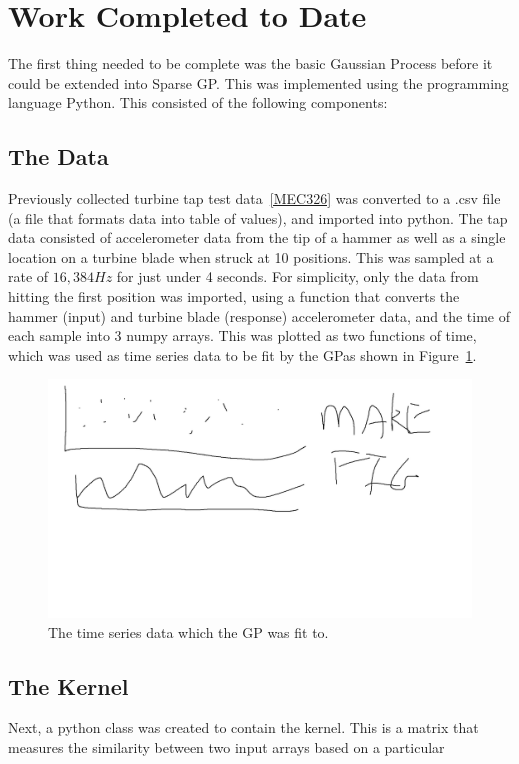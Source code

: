 \documentclass[12pt]{article}
\begin{document}
    \section{Work Completed to Date}
    The first thing needed to be complete was the basic Gaussian Process before it could be extended into Sparse GP\@.
    This was implemented using the programming language Python.
    This consisted of the following components:
    \subsection{The Data}
    Previously collected turbine tap test data~\ref{MEC326} was converted to a .csv file (a file that formats data into table of values), and imported into python.
    The tap data consisted of accelerometer data from the tip of a hammer as well as a single location on a turbine blade when struck at 10 positions.
    This was sampled at a rate of $16,384 Hz$ for just under 4 seconds.
    For simplicity, only the data from hitting the first position was imported, using a function that converts the hammer (input) and turbine blade (response) accelerometer data, and the time of each sample into 3 numpy arrays.
    This was plotted as two functions of time, which was used as time series data to be fit by the GP\@ as shown in Figure~\ref{fig:input-response-plot}.

    \begin{figure}[htbp]
        \centering
        \includegraphics[width=0.8\linewidth]{figures/input-response-plot/input-response-plot.png}
        \caption{The time series data which the GP was fit to.}
        \label{fig:input-response-plot}
    \end{figure}



    \subsection{The Kernel}
    Next, a python class was created to contain the kernel.
    This is a matrix that measures the similarity between two input arrays based on a particular
\end{document}
